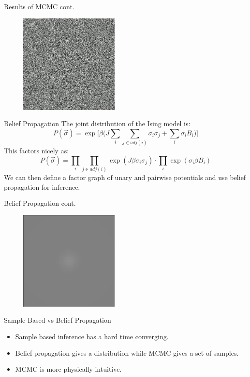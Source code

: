 \documentclass{minesbeamer}
\begin{document}
\begin{frame}{Results of MCMC cont.}
    \centering
    \begin{figure}
    \href{https://drive.google.com/file/d/1rxzwuteOm7bDoig8iRXaAgJcydNfbF3O/view?usp=drive_link}{\includegraphics[width = 5 cm, height = 5cm]{mcmc.png}}
    \end{figure}
\end{frame}

\begin{frame}{Belief Propagation}
    \centering
    The joint distribution of the Ising model is:
    \[
    P(\vec{\sigma}) = \exp \Bigr [ \beta \Bigr ( J\sum_i \sum_{j \in adj(i)} \sigma_i \sigma_j + \sum_i \sigma_i B_i \Bigr ) \Bigr ]
    \]
    This factors nicely as:
    \[
    P(\vec{\sigma}) = \prod_i \prod_{j \in adj(i)} \exp (J \beta \sigma_i \sigma_j) \cdot \prod_i \exp(\sigma_i \beta B_i)
    \]
    We can then define a factor graph of unary and pairwise potentials and use 
    belief propagation for inference. 
\end{frame}

\begin{frame}{Belief Propagation cont.}
    \centering
    \begin{figure}
    \href{https://drive.google.com/file/d/1EIDcN95oOABF0ZoCHTdMfJtEQk6D3qU0/view?usp=drive_link}{\includegraphics[width = 5 cm, height = 5cm]{bp.png}}
    \end{figure}
\end{frame}

\begin{frame}{Sample-Based vs Belief Propagation}
    \begin{itemize}
        \item 
        Sample based inference has a hard time converging.
        \item 
        Belief propagation gives a distribution while MCMC gives a set of 
        samples.
        \item MCMC is more physically intuitive.
    \end{itemize}
\end{frame}
\end{document}

